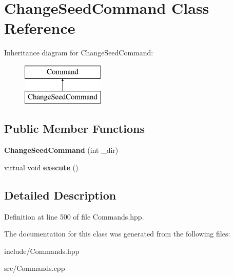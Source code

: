 \hypertarget{class_change_seed_command}{}\section{Change\+Seed\+Command Class Reference}
\label{class_change_seed_command}
Inheritance diagram for Change\+Seed\+Command\+:\begin{figure}[H]
\begin{center}
\leavevmode
\includegraphics[height=2.000000cm]{class_change_seed_command}
\end{center}
\end{figure}
\subsection*{Public Member Functions}
\begin{DoxyCompactItemize}
\item 
\hypertarget{class_change_seed_command_a9a5c1160763f1fc6ebcdff544983b129}{}{\bfseries Change\+Seed\+Command} (int \+\_\+dir)\label{class_change_seed_command_a9a5c1160763f1fc6ebcdff544983b129}

\item 
\hypertarget{class_change_seed_command_ab9f546fd701ddfd368de5975864772df}{}virtual void {\bfseries execute} ()\label{class_change_seed_command_ab9f546fd701ddfd368de5975864772df}

\end{DoxyCompactItemize}


\subsection{Detailed Description}


Definition at line 500 of file Commands.\+hpp.



The documentation for this class was generated from the following files\+:\begin{DoxyCompactItemize}
\item 
include/Commands.\+hpp\item 
src/Commands.\+cpp\end{DoxyCompactItemize}
